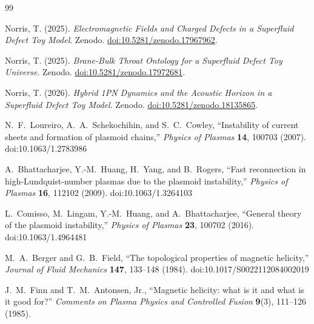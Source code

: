 \documentclass[11pt]{article}
\theoremstyle{plain}
\theoremstyle{definition}
\theoremstyle{remark}
\begin{document}
\begin{thebibliography}{99}

Norris, T. (2025).
\newblock \emph{Electromagnetic Fields and Charged Defects in a Superfluid Defect Toy Model}.
\newblock Zenodo.
\newblock \href{https://doi.org/10.5281/zenodo.17967962}{doi:10.5281/zenodo.17967962}.

Norris, T. (2025).
\newblock \emph{Brane-Bulk Throat Ontology for a Superfluid Defect Toy Universe}.
\newblock Zenodo.
\newblock \href{https://doi.org/10.5281/zenodo.17972681}{doi:10.5281/zenodo.17972681}.

Norris, T. (2026).
\newblock \emph{Hybrid 1PN Dynamics and the Acoustic Horizon in a Superfluid Defect Toy Model}.
\newblock Zenodo.
\newblock \href{https://doi.org/10.5281/zenodo.18135865}{doi:10.5281/zenodo.18135865}.

N.~F.~Loureiro, A.~A.~Schekochihin, and S.~C.~Cowley,
``Instability of current sheets and formation of plasmoid chains,''
\emph{Physics of Plasmas} \textbf{14}, 100703 (2007).
doi:10.1063/1.2783986

A.~Bhattacharjee, Y.-M.~Huang, H.~Yang, and B.~Rogers,
``Fast reconnection in high-Lundquist-number plasmas due to the plasmoid instability,''
\emph{Physics of Plasmas} \textbf{16}, 112102 (2009).
doi:10.1063/1.3264103

L.~Comisso, M.~Lingam, Y.-M.~Huang, and A.~Bhattacharjee,
``General theory of the plasmoid instability,''
\emph{Physics of Plasmas} \textbf{23}, 100702 (2016).
doi:10.1063/1.4964481

M.~A.~Berger and G.~B.~Field,
``The topological properties of magnetic helicity,''
\emph{Journal of Fluid Mechanics} \textbf{147}, 133--148 (1984).
doi:10.1017/S0022112084002019

J.~M.~Finn and T.~M.~Antonsen, Jr.,
``Magnetic helicity: what is it and what is it good for?''
\emph{Comments on Plasma Physics and Controlled Fusion} \textbf{9}(3), 111--126 (1985).

\end{thebibliography}
\end{document}
